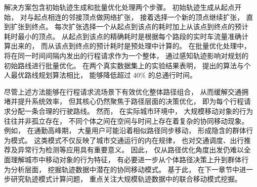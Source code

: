 解决方案包含初始轨迹生成和批量优化处理两个步骤。 初始轨迹生成从起点开始， 对与起点相连的邻接顶点做网络扩张， 接着选择一个新的顶点继续扩张， 直到扩张到终点。 每次扩张选择一个从起点到该点的耗时加上从该点到终点的预计耗时最小的顶点。 从起点到该点的精确耗时是根据每个路段的实时车流量准确计算出来的， 而从该点到终点的预计耗时是预处理中计算的。 在批量优化处理中， 将在同一时间间隔内发出的行程请求作为一个整体， 通过感知轨迹影响对规划的初始路线进行批量优化。 在两个真实数据集上的实验结果表明， 提出的算法与个人最优路线规划算法相比， 能够降低超过 40\% 的总通行时间。

尽管上述方法能够在行程请求流场景下有效优化整体路径组合， 从而缓解交通拥堵并提升系统效率， 但其核心仍然聚焦于路径层面的决策优化， 即为每个行程请求分配一条合理的行驶路线。 然而， 在实际城市环境中， 大规模移动对象的行为往往并非孤立存在， 不同个体之间在空间与时间上存在着复杂的协同移动现象。 例如， 在通勤高峰期， 大量用户可能沿着相似路径同步移动， 形成隐含的群体行为模式。 这类模式不仅反映了城市交通运行的内在规律， 也对交通调度、出行推荐及异常行为检测等应用具有重要意义。 因此， 仅从路径优化角度出发仍难以全面理解城市中移动对象的行为特征， 有必要进一步从个体路径决策上升到群体行为分析层面， 挖掘轨迹数据中潜在的协同移动模式。 基于此， 在下一章节中进一步研究轨迹模式计算问题， 重点关注大规模轨迹数据中的联合移动模式挖掘。
